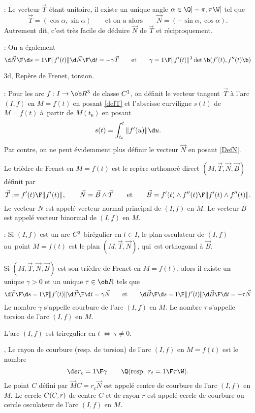 \Remarque : Le vecteur $\vec T$ \'etant unitaire, il existe un unique angle $\alpha\in\Q]-\pi,\pi\W]$ tel que
$$
\vec T=(\cos\alpha,\sin\alpha)\qquad\mbox{et on a alors}\qquad\vec N=(-\sin\alpha,\cos\alpha). 
$$
Autrement dit, c'est tr\`es facile de d\'eduire $\vec N$ de $\vec T$ et r\'eciproquement. 
\bigskip

\Remarque : On a \'egalement 
$$
{\d \vec N\F\d s}={1\F\|f'(t)\|}{\d\vec N\F\d t}=-\gamma\vec T\qquad\mbox{et}\qquad 
\gamma={1\F\|f'(t)\|^3}\det\b(f'(t),f''(t)\b)
$$

\Subsection 3d, Rep\`ere de Frenet, torsion.
\bigskip

\Remarque : Pour les arc $f:I\to\ob R^3$ de classe $\sc C^1$, on d\'efinit le vecteur tangent~$\vec T$ \`a l'arc $(I,f)$ en $M=f(t)$ 
en posant \eqref{defT} et l'abscisse curviligne $s(t)$ de $M=f(t)$ \`a~partir de $M(t_0)$ en posant 
$$
s(t)=\int_{t_0}^t\|f'(u)\|\d u. 
$$
Par contre, on ne peut \'evidemment 
plus d\'efinir le vecteur $\vec N$ en posant \eqref{DefN}. 
\bigskip

Le tri\`edre de Frenet en $M=f(t)$ est le rep\`ere orthonor\'e direct 
$(M,\vec T,\vec N,\vec B)$ d\'efinit par 
$$
\vec T:={f'(t)\F\|f'(t)\|},\qquad \vec N=\vec B\wedge\vec T\qquad\mbox{et}\qquad
\vec B={f'(t)\wedge f''(t)\F\|f'(t)\wedge f''(t)\|}. 
$$ 
Le vecteur $N$ est appel\'e vecteur normal principal de $(I,f)$ en $M$. \pn
Le vecteur $B$ est appel\'e vecteur binormal de $(I,f)$ en $M$. 
\bigskip

\Remarque : Si $(I,f)$ est un arc $\sc C^2$ bir\'egulier en $t\in I$, 
le plan osculateur de $(I,f)$ au~point $M=f(t)$ est le plan $(M,\vec T,\vec N)$, qui~est orthogonal \`a $\vec B$. 
\bigskip

Si $(M,\vec T,\vec N,\vec B)$ est son tri\`edre de Frenet en $M=f(t)$, alors il existe un unique
$\gamma>0$ et un unique $\tau\in\ob R$ tels que 
$$
{\d \vec T\F\d s}={1\F\|f'(t)\|}{\d\vec T\F\d t}=\gamma\vec N\qquad\mbox{et}
\qquad{\d \vec B\F\d s}={1\F\|f'(t)\|}{\d\vec B\F\d t}=-\tau\vec N
$$
Le nombre $\gamma$ s'appelle courbure de l'arc $(I,f)$ en $M$. \pn
Le nombre $\tau$ s'appelle torsion de l'arc $(I,f)$ en $M$. 


L'arc $(I,f)$ est triregulier en $t\ \Longleftrightarrow\ \tau\neq0$. 

, 
Le rayon de courbure (resp. de torsion) de l'arc $(I,f)$ en $M=f(t)$ est le nombre 
$$
\ds r_c={1\F \gamma}\qquad\Q(\mbox{resp. } r_t={1\F\tau}\W).
$$ 
Le point $C$ d\'efini par $\vec MC=r_c\vec N$ est appel\'e centre de courbure de l'arc $(I,f)$ en $M$. \pn
Le cercle $\sc C(C,r)$ de centre $C$ et de rayon $r$ est appel\'e cercle de courbure 
ou cercle osculateur de l'arc $(I,f)$ en $M$. 
\bigskip

